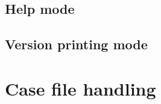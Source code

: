 \documentclass[%
	pdftex,
	oneside,        %
	11pt,           %
	parskip=half,   %
	headsepline,    %
	footsepline,    %
	abstracton,     %
	USenglish,      %
	a4paper,        %
]{report}
\begin{document}
\subsection{Help mode}
\label{sec:Help}
\subsection{Version printing mode}

\section{Case file handling}
\label{sec:CaseFile}
%

\lstlistoflistings
\printbibliography

\begin{appendices}




\end{appendices}
\end{document}
